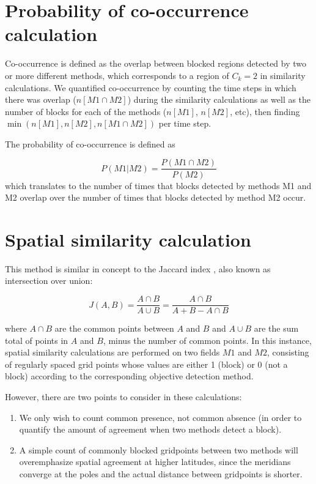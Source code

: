 \documentclass[smallextended]{svjour3}       %
\numberwithin{equation}{section}
\begin{document}
\begin{appendices}
\section{Probability of co-occurrence calculation}\label{probcalc}

Co-occurrence is defined as the overlap between blocked regions detected by two or more different methods, which corresponds to a region of $C_k=2$ in similarity calculations. We quantified co-occurrence by counting the time steps in which there was overlap ($n[M1\cap  M2]$) during the similarity calculations as well as the number of blocks for each of the methods ($n[M1]$, $n[M2]$, etc), then finding $\min(n[M1],n[M2],n[M1\cap M2])$ per time step.

The probability of co-occurrence is defined as 

\begin{equation}
P(M1|M2) = \frac{P(M1\cap M2)}{P(M2)}
\end{equation} which translates to the number of times that blocks detected by methods M1 and M2 overlap over the number of times that blocks detected by method M2 occur.


\section{Spatial similarity calculation}\label{simcalc}

This method is similar in concept to the Jaccard index \citep{jaccard_nouvelles_1908}, also known as intersection over union:

\begin{equation}
J(A,B) = \frac{A\cap B}{A\cup B} = \frac{A\cap B}{A+B-A\cap B}
\end{equation}

\noindent
where $A\cap B$ are the common points between $A$ and $B$ and $A\cup B$ are the sum total of points in $A$ and $B$, minus the number of common points. In this instance, spatial similarity calculations are performed on two fields $M1$ and $M2$, consisting of regularly spaced grid points whose values are either 1 (block) or 0 (not a block) according to the corresponding objective detection method. 

However, there are two points to consider in these calculations:
\begin{enumerate}
\item We only wish to count common presence, not common absence (in order to quantify the amount of agreement when two methods detect a block).
\item A simple count of commonly blocked gridpoints between two methods will overemphasize spatial agreement at higher latitudes, since the meridians converge at the poles and the actual distance between gridpoints is shorter.
\end{enumerate}


\end{appendices}
\end{document}
